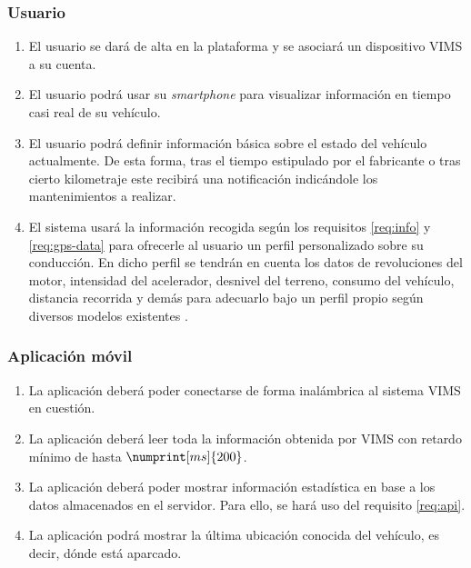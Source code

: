 \subsubsection{Usuario}
\begin{enumerate}[resume, label=\textbf{\texttt{RF-\arabic*}}]
  \item\label{req:register} El usuario se dará de alta en la plataforma y se
        asociará un dispositivo \ac{VIMS} a su cuenta.
  \item\label{req:rt} El usuario podrá usar su \textit{smartphone} para visualizar
        información en tiempo casi real de su vehículo.
  \item\label{req:maintenance} El usuario podrá definir información básica 
        sobre el estado del vehículo actualmente. De esta forma, tras el tiempo
        estipulado por el fabricante o tras cierto kilometraje este recibirá una
        notificación indicándole los mantenimientos a realizar.
  \item\label{req:driving} El sistema usará la información recogida según los
        requisitos \ref{req:info} y \ref{req:gps-data} para ofrecerle al usuario
        un perfil personalizado sobre su conducción. En dicho perfil se tendrán
        en cuenta los datos de revoluciones del motor, intensidad del acelerador,
        desnivel del terreno, consumo del vehículo, distancia recorrida y demás
        para adecuarlo bajo un perfil propio según diversos modelos existentes \cite{husseinaliameenDrivingBehaviourIdentification2021}.
\end{enumerate}

\subsubsection{Aplicación móvil}
\begin{enumerate}[resume, label=\textbf{\texttt{RF-\arabic*}}]
  \item\label{req:app-functions} La aplicación deberá poder conectarse de forma
        inalámbrica al sistema \ac{VIMS} en cuestión.
  \item\label{req:app-sampling} La aplicación deberá leer toda la información
        obtenida por \ac{VIMS} con retardo mínimo de hasta $\numprint[ms]{200}$.
  \item\label{req:app-stats} La aplicación deberá poder mostrar información
        estadística en base a los datos almacenados en el servidor. Para ello,
        se hará uso del requisito \ref{req:api}.
  \item\label{req:location} La aplicación podrá mostrar la última ubicación
        conocida del vehículo, es decir, dónde está aparcado.
\end{enumerate}